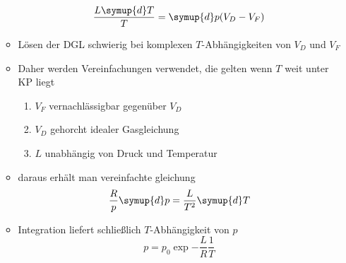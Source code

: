 \begin{itemize}
\begin{itemize}
\begin{equation}
					\frac{L \symup{d}T}{T} = \symup{d}p (V_D - V_F)
				\end{equation}
				\item Lösen der DGL schwierig bei komplexen $T$-Abhängigkeiten von $V_D$ und $V_F$
				\item Daher werden Vereinfachungen verwendet, die gelten wenn $T$ weit unter KP liegt
					\begin{enumerate}
						\item $V_F$ vernachlässigbar gegenüber $V_D$
						\item $V_D$ gehorcht idealer Gasgleichung
						\item $L$ unabhängig von Druck und Temperatur
					\end{enumerate}
				\item daraus erhält man vereinfachte gleichung
					\begin{equation}
						\frac{R}{p} \symup{d}p = \frac{L}{T^2} \symup{d}T
					\end{equation}
				\item Integration liefert schließlich $T$-Abhängigkeit von $p$
					\begin{equation}
						p = p_0 \exp{-\frac{L}{R} \frac{1}{T}}
					\end{equation}
			\end{itemize}
\end{itemize}





